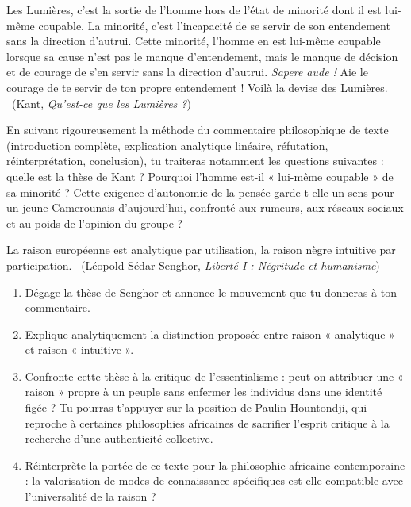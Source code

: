 \documentclass[11pt]{article}
\newcommand{\cle}[1]{{\popxbold\color{popdark}#1}}
\newcounter{popsec}
\newcounter{popsub}
\newcommand{\courssub}[1]{%
  \stepcounter{popsub}%
  \par\vspace{9pt}\noindent{\popxbold\fontsize{11.5}{13}\selectfont\color{popink}{\color{poporange}\thepopsec.\thepopsub}\hspace{6pt}#1}\par\nopagebreak\vspace{4pt}
}
\begin{document}
\courssub{Je me prépare au Bac}

\begin{exercice}
\guillemotleft Les Lumières, c'est la sortie de l'homme hors de l'état de minorité dont il est lui-même coupable. La minorité, c'est l'incapacité de se servir de son entendement sans la direction d'autrui. Cette minorité, l'homme en est lui-même coupable lorsque sa cause n'est pas le manque d'entendement, mais le manque de décision et de courage de s'en servir sans la direction d'autrui. \emph{Sapere aude !} Aie le courage de te servir de ton propre entendement ! Voilà la devise des Lumières. \guillemotright\ (Kant, \emph{Qu'est-ce que les Lumières ?})

En suivant rigoureusement la méthode du commentaire philosophique de texte (introduction complète, explication analytique linéaire, réfutation, réinterprétation, conclusion), tu traiteras notamment les questions suivantes : quelle est la thèse de Kant ? Pourquoi l'homme est-il « lui-même coupable » de sa minorité ? Cette exigence d'autonomie de la pensée garde-t-elle un sens pour un jeune Camerounais d'aujourd'hui, confronté aux rumeurs, aux réseaux sociaux et au poids de l'opinion du groupe ?
\end{exercice}

\begin{exercice}
\guillemotleft La raison européenne est analytique par utilisation, la raison nègre intuitive par participation. \guillemotright\ (Léopold Sédar Senghor, \emph{Liberté I : Négritude et humanisme})

\begin{enumerate}
\item Dégage la thèse de Senghor et annonce le mouvement que tu donneras à ton commentaire.
\item Explique analytiquement la distinction proposée entre raison « analytique » et raison « intuitive ».
\item Confronte cette thèse à la critique de l'\cle{essentialisme} : peut-on attribuer une « raison » propre à un peuple sans enfermer les individus dans une identité figée ? Tu pourras t'appuyer sur la position de Paulin Hountondji, qui reproche à certaines philosophies africaines de sacrifier l'esprit critique à la recherche d'une authenticité collective.
\item Réinterprète la portée de ce texte pour la philosophie africaine contemporaine : la valorisation de modes de connaissance spécifiques est-elle compatible avec l'universalité de la raison ?
\end{enumerate}
\end{exercice}
\end{document}
